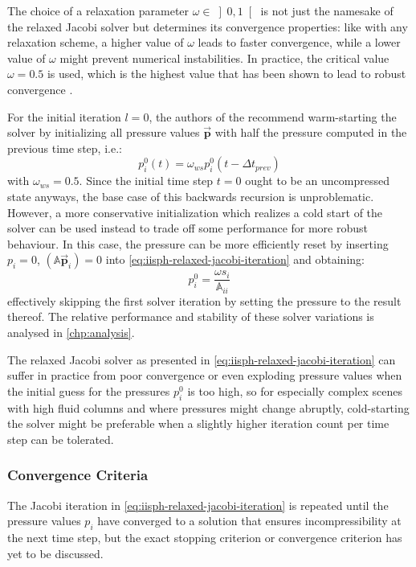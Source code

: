 \documentclass[oneside, a4paper]{book}
\newcommand\vek[1]{\vec{\bm{#1}}}
\newcommand\mat[1]{{\mathds{#1}}}
\newcommand\br[1]{\left(#1\right)}
\begin{document}
    The choice of a relaxation parameter $\omega\in\left]0,1\right[$ is not just the namesake of the relaxed Jacobi solver but determines its convergence properties: like with any relaxation scheme, a higher value of $\omega$ leads to faster convergence, while a lower value of $\omega$ might prevent numerical instabilities. In practice, the critical value $\omega=0.5$ is used, which is the highest value that has been shown to lead to robust convergence \autocite{iisph}.

    For the initial iteration $l=0$, the authors of the \autocite[original paper]{iisph} recommend warm-starting the solver by initializing all pressure values $\vek{p}$ with half the pressure computed in the previous time step, i.e.:
    \begin{equation}
      p^0_i\br{t} = \omega_{ws}p^0_i\br{t-\Delta t_{prev}}
      \label{eq:iisph-warm-start}
    \end{equation}
    with $\omega_{ws}=0.5$. Since the initial time step $t=0$ ought to be an uncompressed state anyways, the base case of this backwards recursion is unproblematic. However, a more conservative initialization which realizes a cold start of the solver can be used instead to trade off some performance for more robust behaviour. In this case, the pressure can be more efficiently reset by inserting $p_i=0$, $\br{\mat{A}\vek{p}_i} = 0$ into \autoref{eq:iisph-relaxed-jacobi-iteration} and obtaining:
    \begin{equation}\label{eq:cold-start-pressure-init}
      p_i^0 = \frac{\omega s_i}{\mat{A}_{ii}}
    \end{equation}
    effectively skipping the first solver iteration by setting the pressure to the result thereof. The relative performance and stability of these solver variations is analysed in \autoref{chp:analysis}.
    
    The relaxed Jacobi solver as presented in \autoref{eq:iisph-relaxed-jacobi-iteration} can suffer in practice from poor convergence or even exploding pressure values when the initial guess for the pressures $p_i^0$ is too high, so for especially complex scenes with high fluid columns and where pressures might change abruptly, cold-starting the solver might be preferable when a slightly higher iteration count per time step can be tolerated.


  \subsubsection{Convergence Criteria}\label{subsec:iisph-convergence}
  The Jacobi iteration in \autoref{eq:iisph-relaxed-jacobi-iteration} is repeated until the pressure values $p_i$ have converged to a solution that ensures incompressibility at the next time step, but the exact stopping criterion or convergence criterion has yet to be discussed. 
\end{document}
